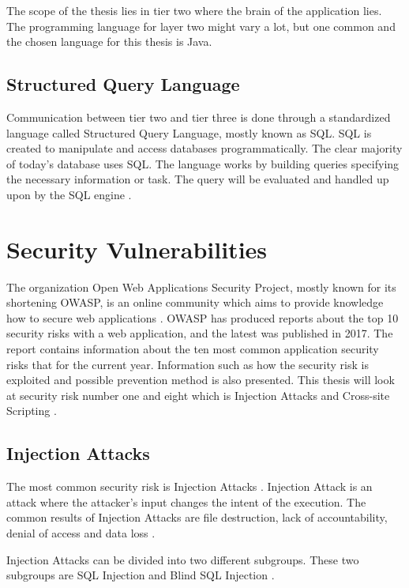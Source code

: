 The scope of the thesis lies in tier two where the brain of the application lies. The programming language for layer two might vary a lot, but one common and the chosen language for this thesis is Java.


\subsection{Structured Query Language}
Communication between tier two and tier three is done through a standardized language called Structured Query Language, mostly known as SQL. SQL is created to manipulate and access databases programmatically. The clear majority of today's database uses SQL. The language works by building queries specifying the necessary information or task. The query will be evaluated and handled up upon by the SQL engine \parencite{DarieCristian2003TPGt}.


\section{Security Vulnerabilities}
\label{SecurityVulnerabilities}
The organization Open Web Applications Security Project, mostly known for its shortening OWASP, is an online community which aims to provide knowledge how to secure web applications \parencite{OpenWebApplicationSecurityProject}. OWASP has produced reports about the top 10 security risks with a web application, and the latest was published in 2017. The report contains information about the ten most common application security risks that for the current year. Information such as how the security risk is exploited and possible prevention method is also presented. This thesis will look at security risk number one and eight which is Injection Attacks and Cross-site Scripting \parencite{OWASP2017}.


\subsection{Injection Attacks}
The most common security risk is Injection Attacks \parencite{OWASP2017}. Injection Attack is an attack where the attacker's input changes the intent of the execution. The common results of Injection Attacks are file destruction, lack of accountability, denial of access and data loss \parencite{Secure_Web}.

Injection Attacks can be divided into two different subgroups. These two subgroups are SQL Injection and Blind SQL Injection \parencite{Secure_Web}.


